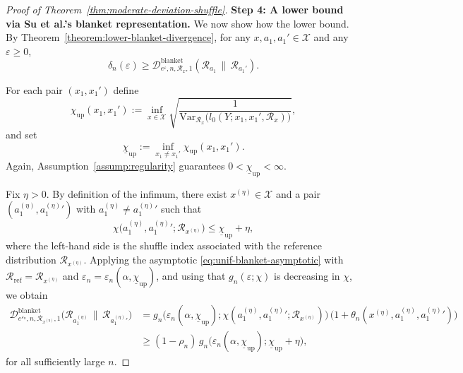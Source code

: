 \documentclass{article}
\theoremstyle{plain}
\theoremstyle{definition}
\begin{document}
\begin{proof}[Proof of Theorem~\ref{thm:moderate-deviation-shuffle}]
\medskip\noindent
\textbf{Step 4: A lower bound via Su et al.'s blanket representation.}
We now show how the lower bound. By Theorem~\ref{theorem:lower-blanket-divergence}, for any
$x,a_1,a_1'\in\mathcal X$ and any $\varepsilon\ge0$,
\[
  \delta_n(\varepsilon)
  \ge
  \mathcal D^{\mathrm{blanket}}_{e^\varepsilon,n,\mathcal R_x,1}
    (\mathcal R_{a_1}\,\|\,\mathcal R_{a_1'}).
\]

For each pair $(x_1,x_1')$ define
\[
  \chi_{\mathrm{up}}(x_1,x_1')
  :=
  \inf_{x\in\mathcal X}
  \sqrt{
    \frac{1}{\mathrm{Var}_{\mathcal R_x}
      \bigl(
        l_0(Y;x_1,x_1',\mathcal R_x)
      \bigr)
    }
  },
\]
and set
\[
  \underline\chi_{\mathrm{up}}
  :=
  \inf_{x_1\neq x_1'} \chi_{\mathrm{up}}(x_1,x_1').
\]
Again, Assumption~\ref{assump:regularity} guarantees
$0<\underline\chi_{\mathrm{up}}<\infty$.

Fix $\eta>0$. By definition of the infimum, there exist
$x^{(\eta)}\in\mathcal X$ and a pair
$(a_1^{(\eta)},a_1^{(\eta)}{}')$ with $a_1^{(\eta)}\neq a_1^{(\eta)}{}'$ such
that
\[
  \chi\bigl(a_1^{(\eta)},a_1^{(\eta)}{}';\mathcal R_{x^{(\eta)}}\bigr)
  \le
  \underline\chi_{\mathrm{up}}+\eta,
\]
where the left-hand side is the shuffle index associated with the
reference distribution $\mathcal R_{x^{(\eta)}}$.
Applying the asymptotic
\eqref{eq:unif-blanket-asymptotic} with
$\mathcal R_{\mathrm{ref}}=\mathcal R_{x^{(\eta)}}$ and
$\varepsilon_n=\varepsilon_n(\alpha,\underline\chi_{\mathrm{up}})$, and
using that $g_n(\varepsilon;\chi)$ is decreasing in $\chi$, we obtain
\[
  \begin{aligned}
  \mathcal D^{\mathrm{blanket}}_{e^{\varepsilon_n},n,\mathcal R_{x^{(\eta)}},1}
    \bigl(
      \mathcal R_{a_1^{(\eta)}}
      \,\big\|\,
      \mathcal R_{a_1^{(\eta)}{}'}
    \bigr)
  &=
  g_n\bigl(\varepsilon_n(\alpha,\underline\chi_{\mathrm{up}});
           \chi(a_1^{(\eta)},a_1^{(\eta)}{}';\mathcal R_{x^{(\eta)}})\bigr)\,
  \bigl(1+\theta_n(x^{(\eta)},a_1^{(\eta)},a_1^{(\eta)}{}')\bigr) \\
  &\ge
  (1-\rho_n)\,
  g_n\bigl(\varepsilon_n(\alpha,\underline\chi_{\mathrm{up}});
           \underline\chi_{\mathrm{up}}+\eta\bigr),
  \end{aligned}
\]
for all sufficiently large $n$.


\end{proof}
\end{document}
